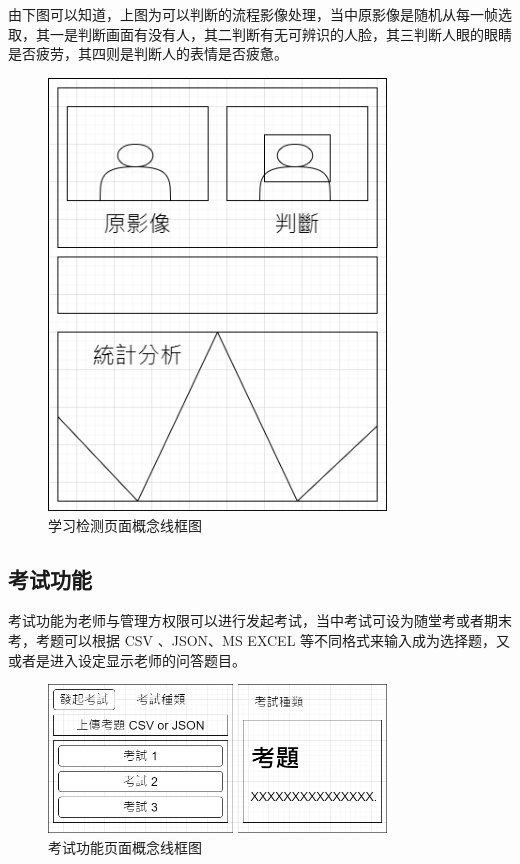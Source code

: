 由下图可以知道，上图为可以判断的流程影像处理，当中原影像是随机从每一帧选取，其一是判断画面有没有人，其二判断有无可辨识的人脸，其三判断人眼的眼睛是否疲劳，其四则是判断人的表情是否疲惫。

\begin{figure}[htb]
\centering 
\includegraphics[width=0.80\textwidth]{img/ch1m13.png} 
\caption{学习检测页面概念线框图}
\label{Test}
\end{figure}

\subsection{考试功能}

考试功能为老师与管理方权限可以进行发起考试，当中考试可设为随堂考或者期末考，考题可以根据 CSV 、JSON、MS EXCEL 等不同格式来输入成为选择题，又或者是进入设定显示老师的问答题目。

\begin{figure}[htb]
\centering 
\includegraphics[width=0.80\textwidth]{img/ch1m14.png} 
\caption{考试功能页面概念线框图}
\label{Test}
\end{figure}

